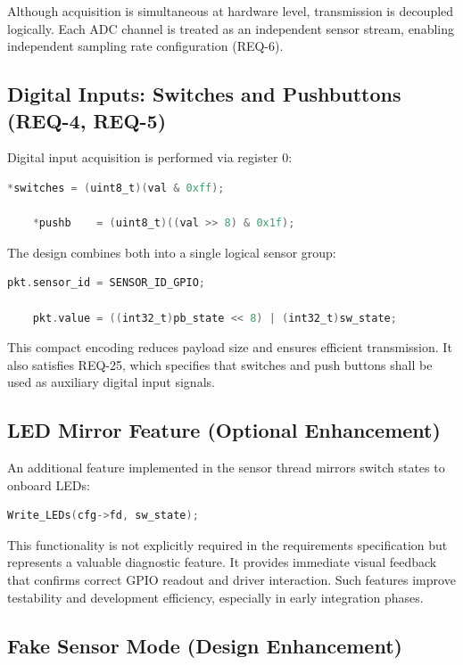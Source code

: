 Although acquisition is simultaneous at hardware level, transmission is decoupled logically. Each ADC channel is treated as an independent sensor stream, enabling independent sampling rate configuration (REQ-6).

\subsection{Digital Inputs: Switches and Pushbuttons (REQ-4, REQ-5)}

Digital input acquisition is performed via register 0:

\begin{lstlisting}[language=C]
	*switches = (uint8_t)(val & 0xff);
	
	*pushb    = (uint8_t)((val >> 8) & 0x1f);
\end{lstlisting}

The design combines both into a single logical sensor group:

\begin{lstlisting}[language=C]
	pkt.sensor_id = SENSOR_ID_GPIO;
	
	pkt.value = ((int32_t)pb_state << 8) | (int32_t)sw_state;
\end{lstlisting}

This compact encoding reduces payload size and ensures efficient transmission. It also satisfies REQ-25, which specifies that switches and push buttons shall be used as auxiliary digital input signals.

\subsection{LED Mirror Feature (Optional Enhancement)}

An additional feature implemented in the sensor thread mirrors switch states to onboard LEDs:

\begin{lstlisting}[language=C]
	Write_LEDs(cfg->fd, sw_state);
\end{lstlisting}

This functionality is not explicitly required in the requirements specification but represents a valuable diagnostic feature. It provides immediate visual feedback that confirms correct GPIO readout and driver interaction. Such features improve testability and development efficiency, especially in early integration phases.

\subsection{Fake Sensor Mode (Design Enhancement)}

